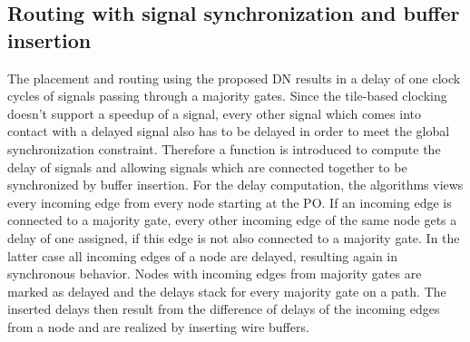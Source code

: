 \subsection{Routing with signal synchronization and buffer insertion}
The placement and routing using the proposed DN results in a delay of one clock cycles of signals passing through a majority gates. Since the tile-based clocking doesn't support a speedup of a signal, every other signal which comes into contact with a delayed signal also has to be delayed in order to meet the global synchronization constraint. Therefore a function is introduced to compute the delay of signals and allowing signals which are connected together to be synchronized by buffer insertion. For the delay computation, the algorithms views every incoming edge from every node starting at the PO. If an incoming edge is connected to a majority gate, every other incoming edge of the same node gets a delay of one assigned, if this edge is not also connected to a majority gate. In the latter case all incoming edges of a node are delayed, resulting again in synchronous behavior. Nodes with incoming edges from majority gates are marked as delayed and the delays stack for every majority gate on a path. The inserted delays then result from the difference of delays of the incoming edges from a node and are realized by inserting wire buffers. 

